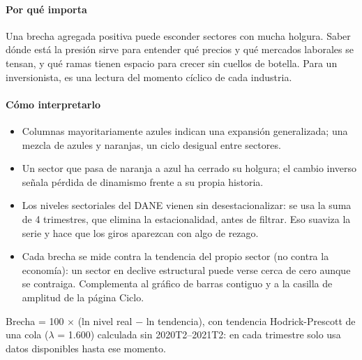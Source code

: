 \paragraph{Por qué importa}
Una brecha agregada positiva puede esconder sectores con mucha holgura. Saber dónde está la presión sirve para entender qué precios y qué mercados laborales se tensan, y qué ramas tienen espacio para crecer sin cuellos de botella. Para un inversionista, es una lectura del momento cíclico de cada industria.

\paragraph{Cómo interpretarlo}
\begin{itemize}
\item Columnas mayoritariamente azules indican una expansión generalizada; una mezcla de azules y naranjas, un ciclo desigual entre sectores.
\item Un sector que pasa de naranja a azul ha cerrado su holgura; el cambio inverso señala pérdida de dinamismo frente a su propia historia.
\item Los niveles sectoriales del DANE vienen sin desestacionalizar: se usa la suma de 4 trimestres, que elimina la estacionalidad, antes de filtrar. Eso suaviza la serie y hace que los giros aparezcan con algo de rezago.
\item Cada brecha se mide contra la tendencia del propio sector (no contra la economía): un sector en declive estructural puede verse cerca de cero aunque se contraiga. Complementa al gráfico de barras contiguo y a la casilla de amplitud de la página Ciclo.
\end{itemize}
\begin{formulas}[Fórmulas]
\end{formulas}
\begin{metodo}[Metodología]
Brecha = 100 $\times$ (ln nivel real − ln tendencia), con tendencia Hodrick-Prescott de una cola ($\lambda$ = 1.600) calculada sin 2020T2–2021T2: en cada trimestre solo usa datos disponibles hasta ese momento.
\par{}
\end{metodo}

